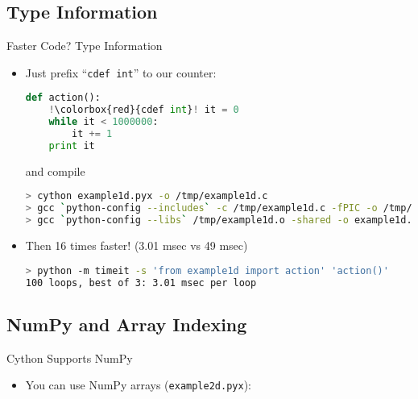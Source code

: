 \documentclass[dvips,xcolor=pst,14pt]{beamer}
\begin{document}
\subsection{
Type Information
}

\begin{frame}[fragile]{
%
Faster Code? Type Information
%
}
\begin{itemize}
\item Just prefix ``{\color{red}\verb+cdef int+}'' to our counter:
\begin{lstlisting}[basicstyle=\scriptsize\ttfamily,language=Python,escapechar=!]
def action():
    !\colorbox{red}{cdef int}! it = 0
    while it < 1000000:
        it += 1
    print it
\end{lstlisting}
and compile
\begin{lstlisting}[basicstyle=\scriptsize\ttfamily,language=bash]
> cython example1d.pyx -o /tmp/example1d.c
> gcc `python-config --includes` -c /tmp/example1d.c -fPIC -o /tmp/example1d.o
> gcc `python-config --libs` /tmp/example1d.o -shared -o example1d.so
\end{lstlisting}
\item Then 16 times faster! (3.01 msec vs 49 msec)
\begin{lstlisting}[language=bash]
> python -m timeit -s 'from example1d import action' 'action()'
100 loops, best of 3: 3.01 msec per loop
\end{lstlisting}
\end{itemize}
\end{frame}

\subsection{
NumPy and Array Indexing
}

\begin{frame}[fragile]{
%
Cython Supports NumPy
%
}
\begin{itemize}
\item You can use NumPy arrays ({\color{red}\verb+example2d.pyx+}):

\end{itemize}
\end{frame}
\end{document}
